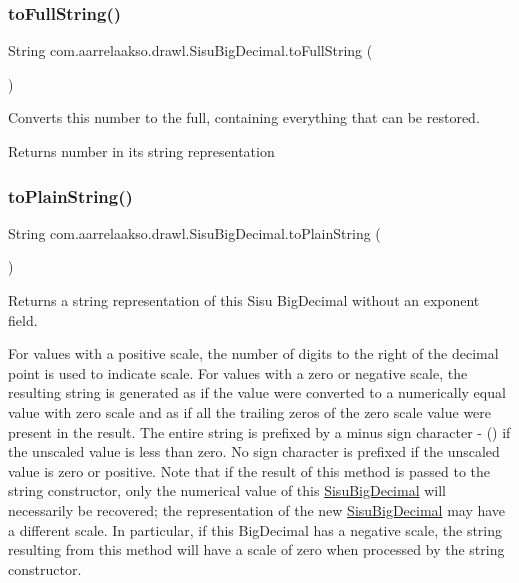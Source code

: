 \subsubsection{\texorpdfstring{to\+Full\+String()}{toFullString()}}
{\footnotesize\ttfamily String com.\+aarrelaakso.\+drawl.\+Sisu\+Big\+Decimal.\+to\+Full\+String (\begin{DoxyParamCaption}{ }\end{DoxyParamCaption})\hspace{0.3cm}{\ttfamily [protected]}}



Converts this number to the full, containing everything that can be restored. 

\begin{DoxyReturn}{Returns}
number in it\textquotesingle{}s string representation 
\end{DoxyReturn}
\mbox{\label{classcom_1_1aarrelaakso_1_1drawl_1_1_sisu_big_decimal_aad76de7e2c8ced754cc3f98f53f5e692}} 
\subsubsection{\texorpdfstring{to\+Plain\+String()}{toPlainString()}}
{\footnotesize\ttfamily String com.\+aarrelaakso.\+drawl.\+Sisu\+Big\+Decimal.\+to\+Plain\+String (\begin{DoxyParamCaption}{ }\end{DoxyParamCaption})\hspace{0.3cm}{\ttfamily [protected]}}



Returns a string representation of this Sisu Big\+Decimal without an exponent field. 

For values with a positive scale, the number of digits to the right of the decimal point is used to indicate scale. For values with a zero or negative scale, the resulting string is generated as if the value were converted to a numerically equal value with zero scale and as if all the trailing zeros of the zero scale value were present in the result. The entire string is prefixed by a minus sign character \textquotesingle{}-\/\textquotesingle{} (\textquotesingle{}\textquotesingle{}) if the unscaled value is less than zero. No sign character is prefixed if the unscaled value is zero or positive. Note that if the result of this method is passed to the string constructor, only the numerical value of this \hyperlink{classcom_1_1aarrelaakso_1_1drawl_1_1_sisu_big_decimal}{Sisu\+Big\+Decimal} will necessarily be recovered; the representation of the new \hyperlink{classcom_1_1aarrelaakso_1_1drawl_1_1_sisu_big_decimal}{Sisu\+Big\+Decimal} may have a different scale. In particular, if this Big\+Decimal has a negative scale, the string resulting from this method will have a scale of zero when processed by the string constructor.

